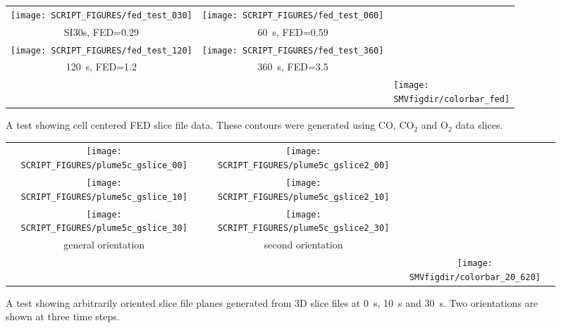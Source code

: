 \documentclass[11pt,twoside]{book}
\begin{document}
\begin{figure}[bph]
\begin{center}
\begin{tabular}{ccp{1.0in}}
 \texttt{[image: SCRIPT\_FIGURES/fed\_test\_030]}&
 \texttt{[image: SCRIPT\_FIGURES/fed\_test\_060]}\\
SI{30}{s}, FED=0.29&\SI{60}{s}, FED=0.59\\
 \texttt{[image: SCRIPT\_FIGURES/fed\_test\_120]}&
 \texttt{[image: SCRIPT\_FIGURES/fed\_test\_360]}\\
\SI{120}{s}, FED=1.2&3\SI{60}{s}, FED=3.5\\
&&\raisebox{0.25in}[0pt]{\texttt{[image: \\SMVfigdir/colorbar\_fed]}}
 \end{tabular}
\end{center}
 \caption[A test showing cell centered FED slice file data]{A test showing cell
 centered FED slice file data.  These contours were generated using $\mathrm{CO}$,
 $\mathrm{CO_2}$ and $\mathrm{O_2}$ data slices. }
\label{figfedslicetest}%
\end{figure}

\begin{figure}[bph]
\begin{center}
\begin{tabular}{cccp{1.0in}}
 \texttt{[image: SCRIPT\_FIGURES/plume5c\_gslice\_00]}&
 \texttt{[image: SCRIPT\_FIGURES/plume5c\_gslice2\_00]}\\

 \texttt{[image: SCRIPT\_FIGURES/plume5c\_gslice\_10]}&
 \texttt{[image: SCRIPT\_FIGURES/plume5c\_gslice2\_10]}\\

 \texttt{[image: SCRIPT\_FIGURES/plume5c\_gslice\_30]}&
 \texttt{[image: SCRIPT\_FIGURES/plume5c\_gslice2\_30]}\\

 general orientation&second orientation\\
 &&\raisebox{0.5in}[0pt]{\texttt{[image: \\SMVfigdir/colorbar\_20\_620]}}\\
 \end{tabular}
\end{center}
 \caption[A test showing arbitrarily oriented slice file planes generated from
 3D slice files]{A test showing arbitrarily oriented slice file planes generated
 from 3D slice files at \SI{0}{s}, \SI{10}{s} and \SI{30}{s}.  Two orientations are
 shown at three time steps. }
\label{figgslicetest}%
\end{figure}
\end{document}
